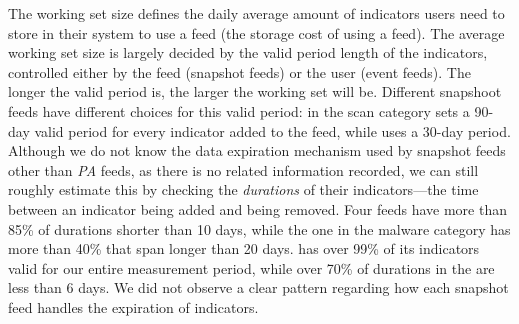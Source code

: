 The working set size defines the daily average amount of indicators users need to store in their
system to use a feed (the storage cost of using a feed). The average
working set size is largely decided by the valid period length
of the indicators, controlled either
by the feed (snapshot feeds) or the user (event feeds). The longer the valid period is,
the larger the working set will be. Different snapshoot feeds have different choices for this
valid period: {\feedTSAlienVault} in the scan category sets a 90-day valid period for
every indicator added to the feed, while {\feedTSAbusech} uses a 30-day period. Although we do not
know the data expiration mechanism used by snapshot feeds other than \emph{PA} feeds, as
there is no related information recorded, we can still roughly estimate this by checking the
\emph{durations} of their indicators---the time between an indicator being added and being removed.
Four {\feedetiprep} feeds have more than 85\% of durations shorter than 10 days, while the one in
the malware category has more than 40\% that span longer than 20 days. {\feedfeodo} has over 99\% of
its indicators valid for our entire measurement period, while over 70\% of durations in the
{\feedzeus} are less than 6 days. We did not observe a clear pattern regarding how each snapshot
feed handles the expiration of indicators.



